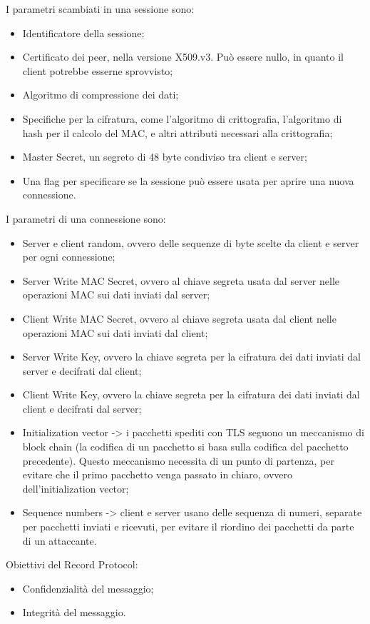 I parametri scambiati in una sessione sono:
\begin{itemize}
    \item Identificatore della sessione;
	\item Certificato dei peer, nella versione X509.v3. Può essere nullo, in quanto il client potrebbe esserne sprovvisto;
	\item Algoritmo di compressione dei dati;
	\item Specifiche per la cifratura, come l'algoritmo di crittografia, l'algoritmo di hash per il calcolo del MAC, e altri attributi necessari alla crittografia;
	\item Master Secret, un segreto di 48 byte condiviso tra client e server;
	\item Una flag per specificare se la sessione può essere usata per aprire una nuova connessione.
\end{itemize}

I parametri di una connessione sono:
\begin{itemize}
    \item Server e client random, ovvero delle sequenze di byte scelte da client e server per ogni connessione;
	\item Server Write MAC Secret, ovvero al chiave segreta usata dal server nelle operazioni MAC sui dati inviati dal server;
	\item Client Write MAC Secret, ovvero al chiave segreta usata dal client nelle operazioni MAC sui dati inviati dal client;
	\item Server Write Key, ovvero la chiave segreta per la cifratura dei dati inviati dal server e decifrati dal client;
	\item Client Write Key, ovvero la chiave segreta per la cifratura dei dati inviati dal client e decifrati dal server;
	\item Initialization vector -> i pacchetti spediti con TLS seguono un meccanismo di block chain (la codifica di un pacchetto si basa sulla codifica del pacchetto precedente). Questo meccanismo necessita di un punto di partenza, per evitare che il primo pacchetto venga passato in chiaro, ovvero dell'initialization vector;
	\item Sequence numbers -> client e server usano delle sequenza di numeri, separate per pacchetti inviati e ricevuti, per evitare il riordino dei pacchetti da parte di un attaccante.
\end{itemize}

Obiettivi del Record Protocol:
\begin{itemize}
    \item Confidenzialità del messaggio;
	\item Integrità del messaggio.
\end{itemize}

